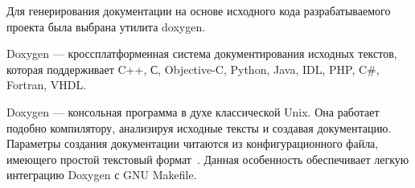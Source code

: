 Для генерирования документации на основе исходного кода разрабатываемого проекта
была выбрана утилита doxygen. 

Doxygen --- кроссплатформенная система документирования исходных текстов,
которая поддерживает C++, С, Objective-C, Python, Java, IDL, PHP, C\#, Fortran,
VHDL.

Doxygen --- консольная программа в духе классической Unix.
Она работает подобно компилятору, анализируя исходные тексты и создавая
документацию. Параметры создания документации читаются из конфигурационного 
файла, имеющего простой текстовый формат~\cite{gen_doc}.
Данная особенность обеспечивает легкую интеграцию Doxygen с GNU Makefile.
